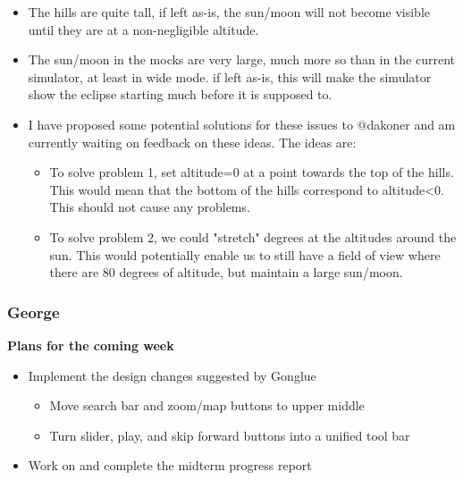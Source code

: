 \documentclass[10pt, onecolumn, draftclsnofoot, letterpaper, compsoc]{IEEEtran}
\begin{document}
    \begin{itemize}
      \item The hills are quite tall, if left as-is, the sun/moon will not become visible until they are at a
        non-negligible altitude.
      \item The sun/moon in the mocks are very large, much more so than in the current simulator, at least in wide mode.
        if left as-is, this will make the simulator show the eclipse starting much before it is supposed to.
      \item I have proposed some potential solutions for these issues to @dakoner and am currently waiting on feedback on
        these ideas. The ideas are:

        \begin{itemize}
        \item To solve problem 1, set altitude=0 at a point towards the top of the hills. This would mean that the bottom
          of the hills correspond to altitude<0. This should not cause any problems.
        \item To solve problem 2, we could "stretch" degrees at the altitudes around the sun. This would potentially
          enable us to still have a field of view where there are 80 degrees of altitude, but maintain a large
          sun/moon.
        \end{itemize}

    \end{itemize}

    \subsubsection{George}

    \noindent \textbf{Plans for the coming week}

    \begin{itemize}

    \item Implement the design changes suggested by Gonglue

    \begin{itemize}
      \item Move search bar and zoom/map buttons to upper middle
      \item Turn slider, play, and skip forward buttons into a unified tool bar
    \end{itemize}

    \item Work on and complete the midterm progress report

    \end{itemize}
\end{document}
